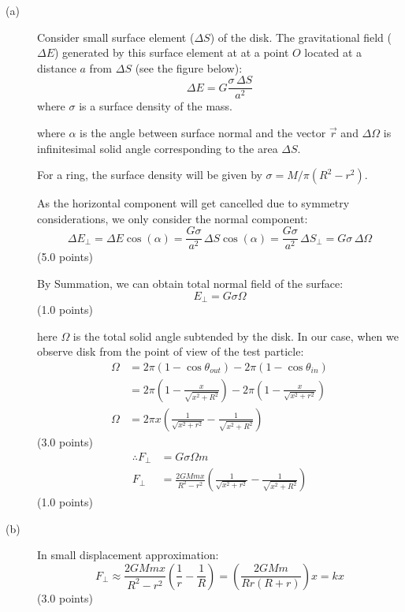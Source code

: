 \begin{description}
\item[(a)] Consider small surface element ($\Delta S$) of the disk. The
  gravitational field ($\Delta E$) generated by this surface element at at a
  point $O$ located at a distance $a$ from $\Delta S$ (see the figure below): %
  \[
    \Delta E = G\frac{\sigma\,\Delta S}{a^2}
  \]
  where $\sigma$ is a surface density of the mass.


  where $\alpha$ is the angle between surface normal and the vector $\vec r$
  and $\Delta\Omega$ is infinitesimal solid angle corresponding to the area
  $\Delta S$.

  For a ring, the surface density will be given by
  $\sigma = M/\pi(R^2 - r^2)$.

  As the horizontal component will get cancelled due to symmetry
  considerations, we only consider the normal component:
  \[
    \Delta E_\perp = \Delta E\cos(\alpha)
      = \frac{G\sigma}{a^2}\,\Delta S\cos(\alpha)
      = \frac{G\sigma}{a^2}\,\Delta S_\perp
      = G\sigma\,\Delta\Omega
  \]
  \hfill(5.0 points)

  By Summation, we can obtain total normal field of the surface:
  \[
    E_\perp = G\sigma\Omega
  \]
  \hfill(1.0 points)

  here $\Omega$ is the total solid angle subtended by the disk. In our case,
  when we observe disk from the point of view of the test particle:
  \begin{align*}
    \Omega &= 2\pi\left(1 - \cos\theta_{out}\right)
              - 2\pi\left(1 - \cos\theta_{in}\right) \\
           &= 2\pi\left(1 - \frac{x}{\sqrt{x^2 + R^2}}\right)
              - 2\pi\left(1 - \frac{x}{\sqrt{x^2 + r^2}}\right) \\
    \Omega &= 2\pi x\left(\frac{1}{\sqrt{x^2 + r^2}}
              - \frac{1}{\sqrt{x^2 + R^2}}\right)
  \end{align*}
  \hfill(3.0 points)
  \begin{align*}
    \therefore F_\perp &= G\sigma\Omega m \\
    F_\perp &= \frac{2GMmx}{R^2 - r^2}
       \left(\frac{1}{\sqrt{x^2 + r^2}} - \frac{1}{\sqrt{x^2 + R^2}}\right)
  \end{align*}
  \hfill(1.0 points)

\item[(b)] In small displacement approximation:
  \[
    F_\perp \approx \frac{2GMmx}{R^2 - r^2}
      \left(\frac{1}{r} - \frac{1}{R}\right)
      = \left(\frac{2GMm}{Rr(R + r)}\right)x = kx
  \]
  \hfill(3.0 points)


\end{description}
